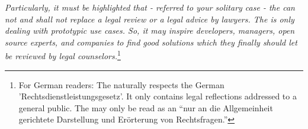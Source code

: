 \textit{Particularly, it must be highlighted that - referred to your solitary
case - the \oslic{} can not and shall not replace a legal review or a legal advice
by lawyers. The \oslic{} is only dealing with prototypic use cases. So, it may
inspire developers, managers, open source experts, and companies to find good
solutions which they finally should let be reviewed by legal
counselors.}\footnote{For German readers: The \oslic{} naturally respects the German
'Rechtsdienstleistungsgesetz'. It only contains legal reflections addressed to a
general public. The \oslic{} may only be read as an \enquote{nur an die
Allgemeinheit gerichtete Darstellung und Erörterung von Rechtsfragen.}}

